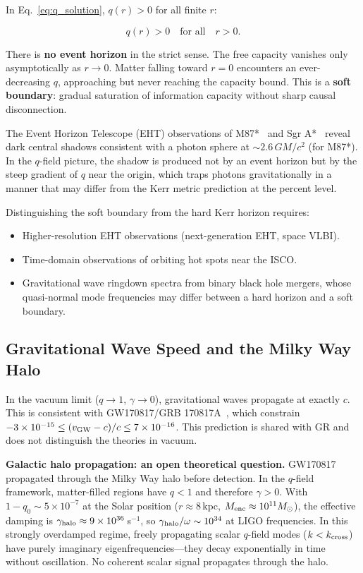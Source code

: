 \documentclass[aps,prd,twocolumn,showpacs,superscriptaddress,preprintnumbers]{revtex4-2}
\begin{document}
In Eq.~\eqref{eq:q_solution}, $q(r)>0$ for all finite $r$:

\begin{equation}
q(r) > 0 \quad \text{for all} \quad r > 0.
\label{eq:soft}
\end{equation}

There is \textbf{no event horizon} in the strict sense.
The free capacity vanishes only asymptotically as $r\to0$.
Matter falling toward $r=0$ encounters an ever-decreasing $q$, approaching but never reaching the capacity bound.
This is a \textbf{soft boundary}: gradual saturation of information capacity without sharp causal disconnection.

The Event Horizon Telescope (EHT) observations of M87*~\cite{EventHorizonTelescope:2019dse} and Sgr A*~\cite{EventHorizonTelescope:2022xnr} reveal dark central shadows consistent with a photon sphere at $\sim2.6\,GM/c^2$ (for M87*).
In the $q$-field picture, the shadow is produced not by an event horizon but by the steep gradient of $q$ near the origin, which traps photons gravitationally in a manner that may differ from the Kerr metric prediction at the percent level.

Distinguishing the soft boundary from the hard Kerr horizon requires:
\begin{itemize}
    \item Higher-resolution EHT observations (next-generation EHT, space VLBI).
    \item Time-domain observations of orbiting hot spots near the ISCO.
    \item Gravitational wave ringdown spectra from binary black hole mergers, whose quasi-normal mode frequencies may differ between a hard horizon and a soft boundary.
\end{itemize}

\subsection{Gravitational Wave Speed and the Milky Way Halo}
\label{sec:gw170817_halo}

In the vacuum limit ($q\to1$, $\gamma\to0$), gravitational waves propagate at exactly $c$.
This is consistent with GW170817/GRB 170817A~\cite{Abbott:2017apx,GW170817grb}, which constrain $-3\times10^{-15}\leq(v_{\rm GW}-c)/c\leq7\times10^{-16}$.
This prediction is shared with GR and does not distinguish the theories in vacuum.

\textbf{Galactic halo propagation: an open theoretical question.}
GW170817 propagated through the Milky Way halo before detection.
In the $q$-field framework, matter-filled regions have $q<1$ and therefore $\gamma>0$.
With $1-q_0 \sim 5\times10^{-7}$ at the Solar position ($r\approx8$\,kpc, $M_{\rm enc}\approx10^{11}M_\odot$), the effective damping is $\gamma_{\rm halo} \approx 9\times10^{36}$\,s$^{-1}$, so $\gamma_{\rm halo}/\omega \sim 10^{34}$ at LIGO frequencies.
In this strongly overdamped regime, freely propagating scalar $q$-field modes ($k < k_{\rm cross}$) have purely imaginary eigenfrequencies---they decay exponentially in time without oscillation.
No coherent scalar signal propagates through the halo.
\end{document}
